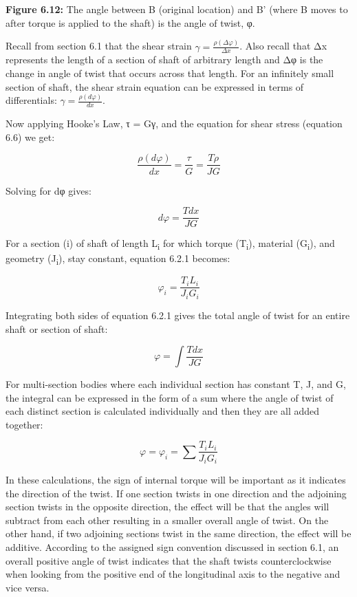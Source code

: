 \documentclass[
  letterpaper,
  DIV=11,
  numbers=noendperiod]{scrreprt}
\begin{document}
\textbf{Figure 6.12:} The angle between B (original location) and B'
(where B moves to after torque is applied to the shaft) is the angle of
twist, φ.

Recall from section 6.1 that the shear strain
\(\gamma=\frac{\rho(\Delta \varphi)}{\Delta x}\). Also recall that Δx
represents the length of a section of shaft of arbitrary length and Δφ
is the change in angle of twist that occurs across that length. For an
infinitely small section of shaft, the shear strain equation can be
expressed in terms of differentials:
\(\gamma=\frac{\rho(d \varphi)}{d x}\).

Now applying Hooke's Law, τ = Gγ, and the equation for shear stress
(equation 6.6) we get:

\[
\frac{\rho(d \varphi)}{d x}=\frac{\tau}{G}=\frac{T \rho}{J G}
\]

Solving for dφ gives:

\[
d \varphi=\frac{T d x}{J G}
\]

For a section (i) of shaft of length L\textsubscript{i} for which torque
(T\textsubscript{i}), material (G\textsubscript{i}), and geometry
(J\textsubscript{i}), stay constant, equation 6.2.1 becomes:

\[
\varphi_i=\frac{T_i L_i}{J_i G_i}
\]

Integrating both sides of equation 6.2.1 gives the total angle of twist
for an entire shaft or section of shaft:

\[
\varphi=\int \frac{T d x}{J G}
\]

For multi-section bodies where each individual section has constant T,
J, and G, the integral can be expressed in the form of a sum where the
angle of twist of each distinct section is calculated individually and
then they are all added together:

\[
\varphi=\varphi_i=\sum \frac{T_i L_i}{J_i G_i}
\]

In these calculations, the sign of internal torque will be important as
it indicates the direction of the twist. If one section twists in one
direction and the adjoining section twists in the opposite direction,
the effect will be that the angles will subtract from each other
resulting in a smaller overall angle of twist. On the other hand, if two
adjoining sections twist in the same direction, the effect will be
additive. According to the assigned sign convention discussed in section
6.1, an overall positive angle of twist indicates that the shaft twists
counterclockwise when looking from the positive end of the longitudinal
axis to the negative and vice versa.
\end{document}
